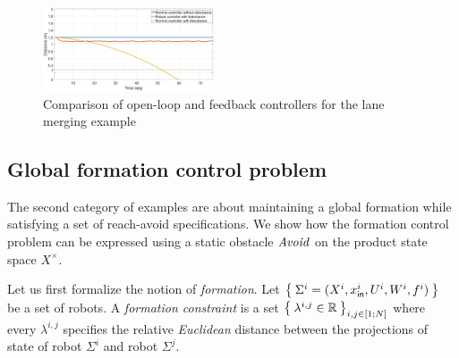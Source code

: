 \begin{figure}[t]
	\centering
	\includegraphics[width=0.45\textwidth]{figures/Merge_plot2.eps}
	\caption{Comparison of open-loop and feedback controllers for the lane merging example}
	\label{fig:merging_distance}
\vspace*{-0.3cm}
\end{figure}

\subsection{Global formation control problem}\label{sec:global formation control}

The second category of examples are about maintaining a global formation while satisfying a set of reach-avoid specifications.
We show how the formation control problem can be expressed using a static obstacle $\mathit{Avoid}$ on the product state space $X^\times$.

Let us first formalize the notion of \emph{formation}.
Let $\Set{\Sigma^i=(X^i,x_{\mathsf{in}}^i,U^i,W^i,f^i)}$ be a set of robots.
A \emph{formation constraint} is a set $\Set{\lambda^{i,j}\in \mathbb{R}}_{i,j\in [1;N]}$ where every $\lambda^{i,j}$ specifies the relative \emph{Euclidean} 
distance between the projections of state of robot $\Sigma^i$ and robot $\Sigma^j$.%

